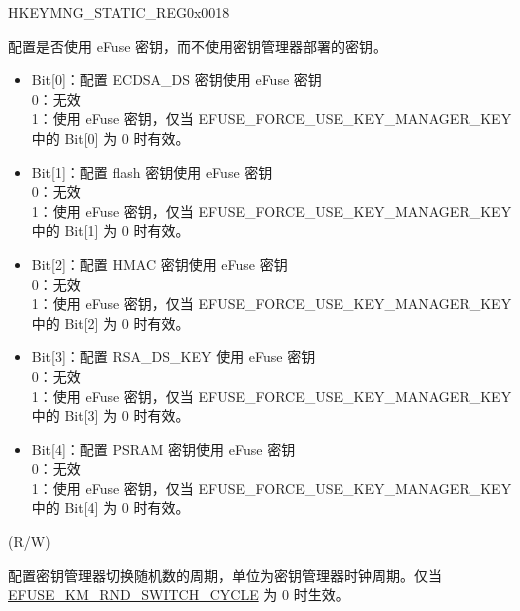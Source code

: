 \begin{register}{H}{KEYMNG\_STATIC\_REG}{0x0018}\label{regdesc:KEYMNGSTATICREG}
%
%
%
%
%
%
\regnewline%
\begin{regdesc}\begin{reglist}
\label{fielddesc:KEYMNGUSEEFUSEKEY}\item [KEYMNG\_USE\_EFUSE\_KEY] 配置是否使用 eFuse 密钥，而不使用密钥管理器部署的密钥。\\
\begin{itemize}
    \item Bit[0]：配置 ECDSA\_DS 密钥使用 eFuse 密钥\\
        0：无效\\
        1：使用 eFuse 密钥，仅当 EFUSE\_FORCE\_USE\_KEY\_MANAGER\_KEY 中的 Bit[0] 为 0 时有效。\\
    \item Bit[1]：配置 flash 密钥使用 eFuse 密钥\\
        0：无效\\
        1：使用 eFuse 密钥，仅当 EFUSE\_FORCE\_USE\_KEY\_MANAGER\_KEY 中的 Bit[1] 为 0 时有效。\\
    \item Bit[2]：配置 HMAC 密钥使用 eFuse 密钥 \\
        0：无效\\
        1：使用 eFuse 密钥，仅当 EFUSE\_FORCE\_USE\_KEY\_MANAGER\_KEY 中的 Bit[2] 为 0 时有效。\\
    \item Bit[3]：配置 RSA\_DS\_KEY 使用 eFuse 密钥 \\
        0：无效\\
        1：使用 eFuse 密钥，仅当 EFUSE\_FORCE\_USE\_KEY\_MANAGER\_KEY 中的 Bit[3] 为 0 时有效。\\
    \item Bit[4]：配置 PSRAM 密钥使用 eFuse 密钥 \\
        0：无效\\
        1：使用 eFuse 密钥，仅当 EFUSE\_FORCE\_USE\_KEY\_MANAGER\_KEY 中的 Bit[4] 为 0 时有效。\\
\end{itemize}
(R/W)
\label{fielddesc:KEYMNGRNDSWITCHCYCLE}\item [KEYMNG\_RND\_SWITCH\_CYCLE] 配置密钥管理器切换随机数的周期，单位为密钥管理器时钟周期。仅当 \hyperref[fielddesc:EFUSEKMRNDSWITCHCYCLE]{EFUSE\_KM\_RND\_SWITCH\_CYCLE} 为 0 时生效。\\

\end{reglist}
\end{regdesc}
\end{register}
